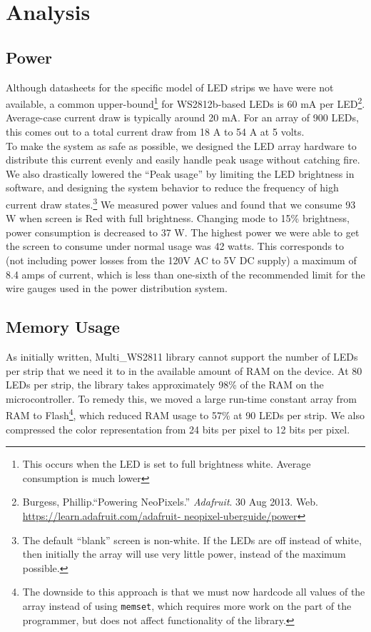 \documentclass[10pt,twocolumn]{article}
\begin{document}
\section{\textbf{Analysis}}
\subsection{Power}
Although datasheets for the specific model of LED strips we have were not
available, a common upper-bound\footnote{This occurs when the LED is set to
full brightness white. Average consumption is much lower} for WS2812b-based 
LEDs is 60 mA per LED\footnote{Burgess, Phillip.``Powering NeoPixels.''
    \textit{Adafruit}. 30 Aug 2013. Web.
    \url{https://learn.adafruit.com/adafruit-
    neopixel-uberguide/power}}. Average-case current draw is typically around
    20 mA. For an array of 900 LEDs, this comes out to a total current draw
    from 18 A to 54 A at 5 volts. \\
    \indent To make the system as safe as possible, we designed the
    LED array hardware to distribute this current evenly and easily
    handle peak usage without catching fire. We also drastically lowered the ``Peak usage'' by limiting the LED brightness in software, and designing the
    system behavior to reduce the frequency of high current draw
    states.\footnote{The default ``blank'' screen is non-white. If the LEDs are off
        instead of white, then initially the array will use very little power,
    instead of the maximum possible.}
    We measured power values and found that we consume 93 W when screen is Red
    with full brightness. Changing mode to 15\% brightness, power consumption
    is decreased to 37 W. The highest power we were able to get the screen to
    consume under normal usage was 42 watts. This
    corresponds to (not including power losses from the 120V AC to 5V DC
    supply) a maximum of 8.4 amps of current, which is less than one-sixth of
    the recommended limit for the wire gauges used in the power distribution
    system.

\subsection{Memory Usage}
As initially written, Multi\_WS2811 library cannot support the number of LEDs
per strip that we need it to in the available amount of RAM on the device. At
80 LEDs per strip, the library takes approximately 98\% of the RAM on the
microcontroller. To remedy this, we moved a large run-time constant array from
RAM to Flash\footnote{The downside to this approach is that we must now
    hardcode all values of the array instead of using \texttt{memset}, which
requires more work on the part of the programmer, but does not affect
functionality of the library.}, which reduced RAM usage to 57\% at 90 LEDs per
strip. We also compressed the color representation from 24 bits per pixel to 
12 bits per pixel.
\end{document}
